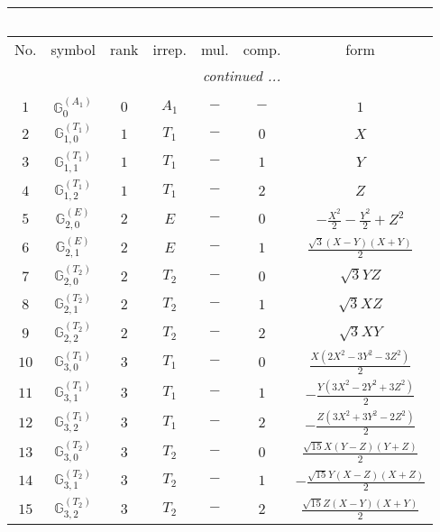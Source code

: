 \documentclass[fleqn,10pt,landscape]{article}
\begin{document}
\begin{itemize}
\begin{center}
\begin{longtable}{ccccccc}
\multicolumn{6}{l}{\tablename\ \thetable{}} \\
 \hline \hline
No. & symbol & rank & irrep. & mul. & comp. & form \\ \hline \endhead

 \hline \hline
\multicolumn{6}{r}{\footnotesize\it continued ...} \\ \endfoot

 \hline \hline
\multicolumn{6}{r}{} \\ \endlastfoot

$ 1 $ & $ \mathbb{G}_{0}^{(A_{1})} $ & $ 0 $ & $ A_{1} $ & $ - $ & $ - $ & $ 1 $ \\ \hline
$ 2 $ & $ \mathbb{G}_{1,0}^{(T_{1})} $ & $ 1 $ & $ T_{1} $ & $ - $ & $ 0 $ & $ X $ \\
$ 3 $ & $ \mathbb{G}_{1,1}^{(T_{1})} $ & $ 1 $ & $ T_{1} $ & $ - $ & $ 1 $ & $ Y $ \\
$ 4 $ & $ \mathbb{G}_{1,2}^{(T_{1})} $ & $ 1 $ & $ T_{1} $ & $ - $ & $ 2 $ & $ Z $ \\ \hline
$ 5 $ & $ \mathbb{G}_{2,0}^{(E)} $ & $ 2 $ & $ E $ & $ - $ & $ 0 $ & $ - \frac{X^{2}}{2} - \frac{Y^{2}}{2} + Z^{2} $ \\
$ 6 $ & $ \mathbb{G}_{2,1}^{(E)} $ & $ 2 $ & $ E $ & $ - $ & $ 1 $ & $ \frac{\sqrt{3} \left(X - Y\right) \left(X + Y\right)}{2} $ \\
$ 7 $ & $ \mathbb{G}_{2,0}^{(T_{2})} $ & $ 2 $ & $ T_{2} $ & $ - $ & $ 0 $ & $ \sqrt{3} Y Z $ \\
$ 8 $ & $ \mathbb{G}_{2,1}^{(T_{2})} $ & $ 2 $ & $ T_{2} $ & $ - $ & $ 1 $ & $ \sqrt{3} X Z $ \\
$ 9 $ & $ \mathbb{G}_{2,2}^{(T_{2})} $ & $ 2 $ & $ T_{2} $ & $ - $ & $ 2 $ & $ \sqrt{3} X Y $ \\ \hline
$ 10 $ & $ \mathbb{G}_{3,0}^{(T_{1})} $ & $ 3 $ & $ T_{1} $ & $ - $ & $ 0 $ & $ \frac{X \left(2 X^{2} - 3 Y^{2} - 3 Z^{2}\right)}{2} $ \\
$ 11 $ & $ \mathbb{G}_{3,1}^{(T_{1})} $ & $ 3 $ & $ T_{1} $ & $ - $ & $ 1 $ & $ - \frac{Y \left(3 X^{2} - 2 Y^{2} + 3 Z^{2}\right)}{2} $ \\
$ 12 $ & $ \mathbb{G}_{3,2}^{(T_{1})} $ & $ 3 $ & $ T_{1} $ & $ - $ & $ 2 $ & $ - \frac{Z \left(3 X^{2} + 3 Y^{2} - 2 Z^{2}\right)}{2} $ \\
$ 13 $ & $ \mathbb{G}_{3,0}^{(T_{2})} $ & $ 3 $ & $ T_{2} $ & $ - $ & $ 0 $ & $ \frac{\sqrt{15} X \left(Y - Z\right) \left(Y + Z\right)}{2} $ \\
$ 14 $ & $ \mathbb{G}_{3,1}^{(T_{2})} $ & $ 3 $ & $ T_{2} $ & $ - $ & $ 1 $ & $ - \frac{\sqrt{15} Y \left(X - Z\right) \left(X + Z\right)}{2} $ \\
$ 15 $ & $ \mathbb{G}_{3,2}^{(T_{2})} $ & $ 3 $ & $ T_{2} $ & $ - $ & $ 2 $ & $ \frac{\sqrt{15} Z \left(X - Y\right) \left(X + Y\right)}{2} $ \\
\end{longtable}
\end{center}


\end{itemize}
\end{document}
